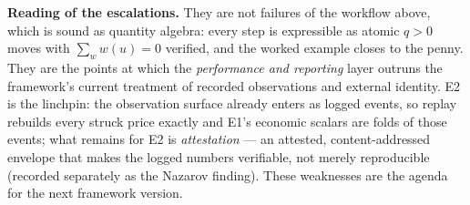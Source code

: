 \documentclass[11pt,a4paper]{article}
\begin{document}
\noindent\textbf{Reading of the escalations.} They are not failures of the workflow above, which is
sound as quantity algebra: every step is expressible as atomic $q>0$ moves with $\sum_w w(u)=0$
verified, and the worked example closes to the penny. They are the points at which the
\emph{performance and reporting} layer outruns the framework's current treatment of recorded
observations and external identity. E2 is the linchpin: the observation surface already enters as
logged events, so replay rebuilds every struck price exactly and E1's economic scalars are folds of
those events; what remains for E2 is \emph{attestation} --- an attested, content-addressed envelope
that makes the logged numbers verifiable, not merely reproducible (recorded separately as the
Nazarov finding). These weaknesses are the agenda for the next framework version.
\end{document}
